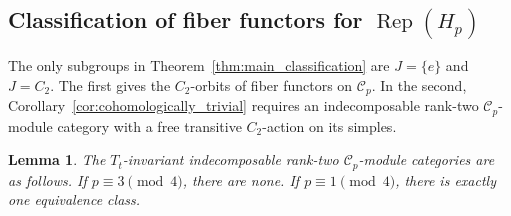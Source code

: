 \documentclass[12pt]{amsart}
\theoremstyle{plain}
\newtheorem{lemma}[theorem]{Lemma}
\theoremstyle{definition} %
\theoremstyle{remark} %
\newcommand{\cC}{\mathcal{C}}
\newcommand{\Rep}{\operatorname{Rep}}
\begin{document}
\subsection{\texorpdfstring{Classification of fiber functors for $\Rep(H_p)$}{Classification of fiber functors for Rep(Hp)}}

The only subgroups in Theorem~\ref{thm:main_classification} are $J=\{e\}$ and $J=C_2$. The first gives the $C_2$-orbits of fiber functors on $\cC_p$. In the second, Corollary~\ref{cor:cohomologically_trivial} requires an indecomposable rank-two $\cC_p$-module category with a free transitive $C_2$-action on its simples.

\begin{lemma}\label{lem:no_rank_two_invariant_nikshych}
The \(T_t\)-invariant indecomposable rank-two \(\cC_p\)-module categories are as follows. If \(p\equiv3\pmod4\), there are none. If \(p\equiv1\pmod4\), there is exactly one equivalence class.
\end{lemma}
\end{document}
